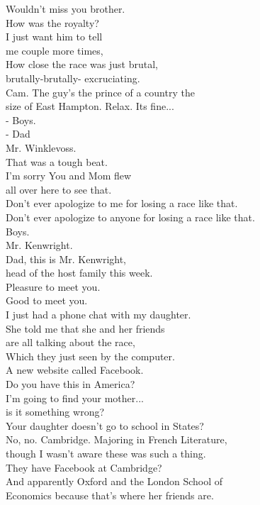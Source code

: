\documentclass{article}
\begin{document}
\begin{multicols}{3}
Wouldn't miss you brother.\\
How was the royalty?\\
I just want him to tell\\
me couple more times,\\
How close the race was just brutal,\\
brutally-brutally- excruciating.\\
Cam. The guy's the prince of a country the\\
size of East Hampton. Relax. Its fine...\\
- Boys.\\
- Dad\\
Mr. Winklevoss.\\
That was a tough beat.\\
I'm sorry You and Mom flew\\
all over here to see that.\\
Don't ever apologize to me for losing a race like that.\\
Don't ever apologize to anyone for losing a race like that.\\
Boys.\\
Mr. Kenwright.\\
Dad, this is Mr. Kenwright,\\
head of the host family this week.\\
Pleasure to meet you.\\
Good to meet you.\\
I just had a phone chat with my daughter.\\
She told me that she and her friends\\
are all talking about the race,\\
Which they just seen by the computer.\\
A new website called Facebook.\\
Do you have this in America?\\
I'm going to find your mother...\\
is it something wrong?\\
Your daughter doesn't go to school in States?\\
No, no. Cambridge. Majoring in French Literature,\\
though I wasn't aware these was such a thing.\\
They have Facebook at Cambridge?\\
And apparently Oxford and the London School of\\
Economics because that's where her friends are.\\

\end{multicols}
\end{document}
